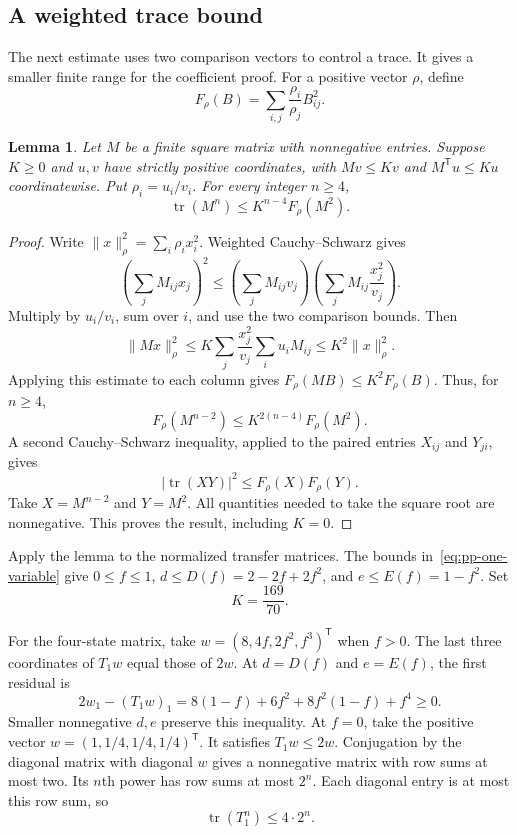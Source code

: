 \documentclass[11pt,a4paper]{article}
\newtheorem{lemma}[theorem]{Lemma}
\theoremstyle{definition}
\theoremstyle{remark}
\newcommand{\T}{\mathsf{T}}
\begin{document}
\subsection{A weighted trace bound}

The next estimate uses two comparison vectors to control a trace.
It gives a smaller finite range for the coefficient proof.
For a positive vector $\rho$, define
\[
F_\rho(B)=\sum_{i,j}\frac{\rho_i}{\rho_j}B_{ij}^2.
\]

\begin{lemma}\label{lem:pp-weighted-trace}
Let $M$ be a finite square matrix with nonnegative entries.
Suppose $K\ge0$ and $u,v$ have strictly positive coordinates, with
$Mv\le Kv$ and $M^\T u\le Ku$ coordinatewise.
Put $\rho_i=u_i/v_i$.
For every integer $n\ge4$,
\[
\operatorname{tr}(M^n)\le K^{n-4}F_\rho(M^2).
\]
\end{lemma}

\begin{proof}
Write $\|x\|_\rho^2=\sum_i\rho_i x_i^2$.
Weighted Cauchy--Schwarz gives
\[
\left(\sum_jM_{ij}x_j\right)^2
\le\left(\sum_jM_{ij}v_j\right)
   \left(\sum_jM_{ij}\frac{x_j^2}{v_j}\right).
\]
Multiply by $u_i/v_i$, sum over $i$, and use the two comparison bounds.
Then
\[
\|Mx\|_\rho^2
\le K\sum_j\frac{x_j^2}{v_j}\sum_i u_iM_{ij}
\le K^2\|x\|_\rho^2.
\]
Applying this estimate to each column gives
$F_\rho(MB)\le K^2F_\rho(B)$.
Thus, for $n\ge4$,
\[
F_\rho(M^{n-2})\le K^{2(n-4)}F_\rho(M^2).
\]
A second Cauchy--Schwarz inequality, applied to the paired entries
$X_{ij}$ and $Y_{ji}$, gives
\[
|\operatorname{tr}(XY)|^2\le F_\rho(X)F_\rho(Y).
\]
Take $X=M^{n-2}$ and $Y=M^2$.
All quantities needed to take the square root are nonnegative.
This proves the result, including $K=0$.
\end{proof}

Apply the lemma to the normalized transfer matrices.
The bounds in~\eqref{eq:pp-one-variable} give
$0\le f\le1$, $d\le D(f)=2-2f+2f^2$, and $e\le E(f)=1-f^2$.
Set
\[
K=\frac{169}{70}.
\]

For the four-state matrix, take
$w=(8,4f,2f^2,f^3)^\T$ when $f>0$.
The last three coordinates of $T_1w$ equal those of $2w$.
At $d=D(f)$ and $e=E(f)$, the first residual is
\[
2w_1-(T_1w)_1
=8(1-f)+6f^2+8f^2(1-f)+f^4\ge0.
\]
Smaller nonnegative $d,e$ preserve this inequality.
At $f=0$, take the positive vector $w=(1,1/4,1/4,1/4)^\T$.
It satisfies $T_1w\le2w$.
Conjugation by the diagonal matrix with diagonal $w$ gives a nonnegative matrix with row sums at most two.
Its $n$th power has row sums at most $2^n$.
Each diagonal entry is at most this row sum, so
\begin{equation}\label{eq:pp-four-trace}
\operatorname{tr}(T_1^n)\le4\cdot2^n.
\end{equation}
\end{document}

